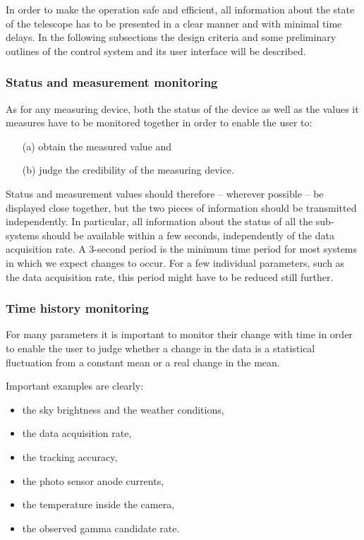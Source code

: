 
\medskip In order to make the operation safe and efficient, all information
about the state of the telescope has to be presented in a clear manner and
with minimal time delays. In the following subsections the design criteria
and some preliminary outlines of the control system and its user interface
will be described.

\subsubsection{Status and measurement monitoring}

As for any measuring device, both the status of the device as well as the
values it measures have to be monitored together in order to enable the user
to:

\begin{itemize}
\item[(a)]  obtain the measured value and

\item[(b)]  judge the credibility of the measuring device.
\end{itemize}

Status and measurement values should therefore -- wherever possible -- be
displayed close together, but the two pieces of information should be
transmitted independently. In particular, all information about the status
of all the sub-systems should be available within a few seconds,
independently of the data acquisition rate. A 3-second period is the minimum
time period for most systems in which we expect changes to occur. For a few
individual parameters, such as the data acquisition rate, this period might
have to be reduced still further.

\subsubsection{Time history monitoring}

For many parameters it is important to monitor their change with time in
order to enable the user to judge whether a change in the data is a
statistical fluctuation from a constant mean or a real change in the mean.

Important examples are clearly:

\begin{itemize}
\item  the sky brightness and the weather conditions,

\item  the data acquisition rate,

\item  the tracking accuracy,

\item  the photo sensor anode currents,

\item  the temperature inside the camera,

\item  the observed gamma candidate rate.
\end{itemize}

